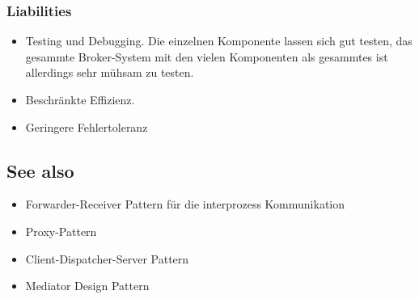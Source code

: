 \subsubsection*{Liabilities}


\begin{itemize}
	\item Testing und Debugging. Die einzelnen Komponente lassen sich gut testen, das gesammte Broker-System mit den vielen Komponenten als gesammtes ist allerdings sehr mühsam zu testen.
	\item Beschränkte Effizienz.
	\item Geringere Fehlertoleranz
\end{itemize}



\subsection*{See also}

\begin{itemize}
	\item Forwarder-Receiver Pattern für die interprozess Kommunikation
	\item Proxy-Pattern
	\item Client-Dispatcher-Server Pattern
	\item Mediator Design Pattern
\end{itemize}